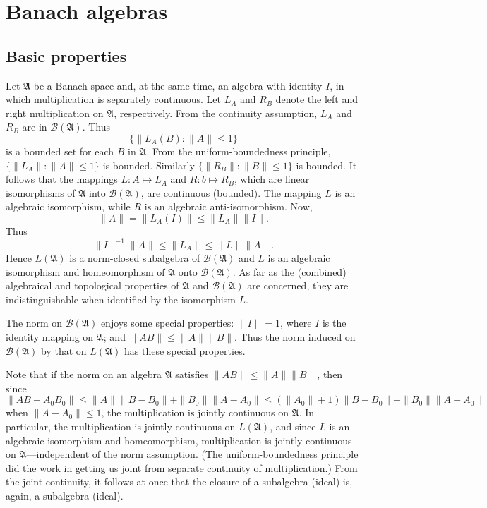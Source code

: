 \section{Banach algebras}
\subsection{Basic properties}
Let $\mathfrak{A}$ be a Banach space and, at the same time, an algebra with identity $I$, in which multiplication is separately continuous. Let $L_A$ and $R_B$ denote the left and right multiplication on $\mathfrak{A}$, respectively. From the continuity assumption, $L_A$ and $R_B$ are in $\mathcal{B}(\mathfrak{A})$. Thus 
\[\{\|L_A(B):\|A\|\leq 1\}\]
is a bounded set for each $B$ in $\mathfrak{A}$. From the uniform-boundedness principle, $\{\|L_A\|:\|A\|\leq 1\}$ is bounded. Similarly $\{\|R_B\|:\|B\|\leq 1\}$ is bounded. It follows that the mappings $L:A\mapsto L_A$ and $R:b\mapsto R_B$, which are linear isomorphisms of $\mathfrak{A}$ into $\mathcal{B}(\mathfrak{A})$, are continuous (bounded). The mapping $L$ is an algebraic isomorphism, while $R$ is an algebraic anti-isomorphism. Now,
\[\|A\|=\|L_A(I)\|\leq\|L_A\|\|I\|.\]
Thus
\[\|I\|^{-1}\|A\|\leq\|L_A\|\leq\|L\|\|A\|.\]
Hence $L(\mathfrak{A})$ is a norm-closed subalgebra of $\mathcal{B}(\mathfrak{A})$ and $L$ is an algebraic isomorphism and homeomorphism of $\mathfrak{A}$ onto $\mathcal{B}(\mathfrak{A})$. As far as the (combined) algebraical and topological properties of $\mathfrak{A}$ and $\mathcal{B}(\mathfrak{A})$ are concerned, they are indistinguishable when identified by the isomorphism $L$.\par
The norm on $\mathcal{B}(\mathfrak{A})$ enjoys some special properties: $\|I\|=1$, where $I$ is the identity mapping on $\mathfrak{A}$; and $\|AB\|\leq\|A\|\|B\|$. Thus the norm induced on $\mathcal{B}(\mathfrak{A})$ by that on $L(\mathfrak{A})$ has these special properties.\par
Note that if the norm on an algebra $\mathfrak{A}$ satisfies $\|AB\|\leq\|A\|\|B\|$, then since
\[\|AB-A_0B_0\|\leq\|A\|\|B-B_0\|+\|B_0\|\|A-A_0\|\leq(\|A_0\|+1)\|B-B_0\|+\|B_0\|\|A-A_0\|\]
when $\|A-A_0\|\leq 1$, the multiplication is jointly continuous on $\mathfrak{A}$. In particular, the multiplication is jointly continuous on $L(\mathfrak{A})$, and since $L$ is an algebraic isomorphism and homeomorphism, multiplication is jointly continuous on $\mathfrak{A}$---independent of the norm assumption. (The uniform-boundedness principle did the work in getting us joint from separate continuity of multiplication.) From the joint continuity, it follows at once that the closure of a subalgebra (ideal) is, again, a subalgebra (ideal).\par
